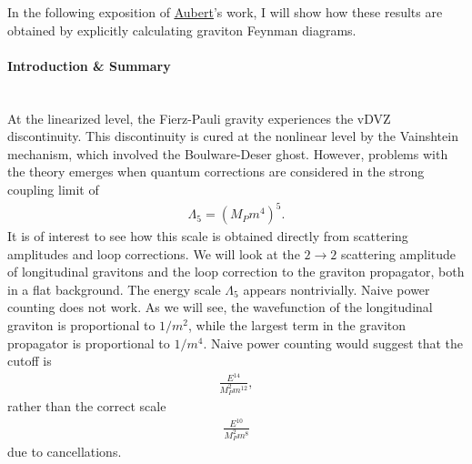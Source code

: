 \documentclass{book}
\theoremstyle{definition}
\newcommand{\f}[2]{\frac{#1}{#2}}
\newcommand{\lp}{\left(}
\newcommand{\rp}{\right)}
\begin{document}
In the following exposition of \href{https://arxiv.org/pdf/hep-th/0312246.pdf}{\underline{Aubert}}'s work, I will show how these results are obtained by explicitly calculating graviton Feynman diagrams.
\begin{framed}
	\paragraph{Introduction \& Summary}$\,$\\
	
	At the linearized level, the Fierz-Pauli gravity experiences the vDVZ discontinuity. This discontinuity is cured at the nonlinear level by the Vainshtein mechanism, which involved the Boulware-Deser ghost. However, problems with the theory emerges when quantum corrections are considered in the strong coupling limit of
	\begin{align}
	\Lambda_5 = \lp M_P m^4 \rp^5.
	\end{align} 
	It is of interest to see how this scale is obtained directly from scattering amplitudes and loop corrections. We will look at the $2\to 2$ scattering amplitude of longitudinal gravitons and the loop correction to the graviton propagator, both in a flat background. The energy scale $\Lambda_5$ appears nontrivially. Naive power counting does not work. As we will see, the wavefunction of the longitudinal graviton is proportional to $1/m^2$, while the largest term in the graviton propagator is proportional to $1/m^4$. Naive power counting would suggest that the cutoff is 
	\begin{align}
	\f{E^{14}}{M_P^2 m^{12}},
	\end{align} 
	rather than the  correct scale
	\begin{align}
	\f{E^{10}}{ M_P^2 m^{8}}
	\end{align}
	due to cancellations. 
\end{framed}
\end{document}
